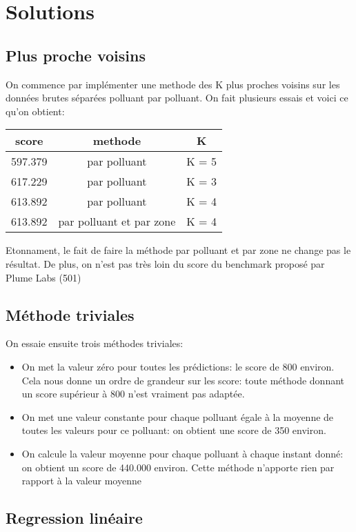 \section{Solutions}

\subsection{Plus proche voisins}

On commence par implémenter une methode des K plus proches voisins sur les données brutes séparées polluant par polluant.
On fait plusieurs essais et voici ce qu'on obtient:

\begin{tabular}{|c|c|c|}
  \hline
  score & methode & K \\
  \hline
  597.379 &  par polluant & K = 5\\
  \hline
  617.229 & par polluant & K = 3\\
  \hline
  613.892 & par polluant  & K = 4\\
  \hline
  613.892 & par polluant et par zone & K = 4\\
  \hline
\end{tabular}

Etonnament, le fait de faire la méthode par polluant et par zone ne change pas le résultat.
De plus, on n'est pas très loin du score du benchmark proposé par Plume Labs (501)

\subsection{Méthode triviales}

On essaie ensuite trois méthodes triviales:
\begin{itemize}
  \item
    On met la valeur zéro pour toutes les prédictions: le score de 800 environ.
    Cela nous donne un ordre de grandeur sur les score: toute méthode donnant un score supérieur à 800 n'est vraiment pas adaptée.
  \item
    On met une valeur constante pour chaque polluant égale à la moyenne de toutes les valeurs pour ce polluant: on obtient une score de 350 environ.
  \item
    On calcule la valeur moyenne pour chaque polluant à chaque instant donné: on obtient un score de 440.000 environ.
    Cette méthode n'apporte rien par rapport à la valeur moyenne
\end{itemize}

\subsection{Regression linéaire}


